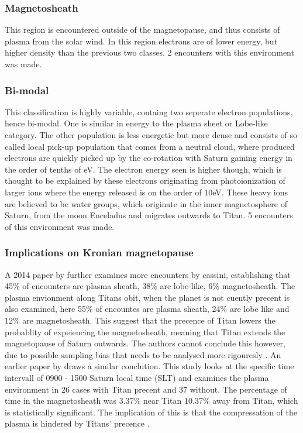 \documentclass[12pt, parskip=full*, abstract]{scrartcl}
\begin{document}
\subsubsection{Magnetosheath}

This region is encountered outside of the magnetopause, and thus consists of plasma from the solar wind. In this region electrons are of lower energy, but higher density than the previous two classes. 2 encounters with this environment was made.\parencite{Rymer-class}

\subsubsection{Bi-modal}
This classification is highly variable, containg two seperate electron populations, hence bi-modal. One is similar in energy to the plasma sheet or Lobe-like category. The other population is less energetic but more dense and consists of so called local pick-up population that comes from a neutral cloud, where produced electrons are quickly picked up by the co-rotation with Saturn gaining energy in the order of tenths of eV. The electron energy seen is higher though, which is thought to be explained by these electrons originating from photoionization of larger ions where the energy released is on the order of 10eV. These heavy ions are believed to be water groups, which originate in the inner magnetosphere of Saturn, from the moon Enceladus and migrates outwards to Titan. 5 encounters of this environment was made.\parencite{Rymer-class}

\subsubsection{Implications on Kronian magnetopause}
A 2014 paper by \textcite{Smith-WithOrWithoutTitan} further examines more encounters by cassini, establishing that 45\% of encounters are plasma sheath, 38\% are lobe-like, 6\% magnetosheath. The plasma envionment along Titans obit, when the planet is not cuently precent is also examined, here 55\% of encountes are plasma sheath, 24\% are lobe like and 12\% are magnetosheath. This suggest that the precence of Titan lowers the probablity of expeiencing the magnetosheath, meaning that Titan extends the magnetopause of Saturn outwards.
The authors cannot conclude this however, due to possible sampling bias that needs to be analysed more rigouresly \parencite{Smith-WithOrWithoutTitan}. An earlier paper by \textcite{Wei-WithOrWithoutTitan} draws a similar conclution. This study looks at the specific time intervall of 0900 - 1500 Saturn local time (SLT) and examines the plasma environment in 26 cases with Titan precent and 37 without. The percentage of time in the magnetosheath was 3.37\% near Titan 10.37\% away from Titan, which is statistically significant. The implication of this is that the compressation of the plasma is hindered by Titans' precence \parencite{Wei-WithOrWithoutTitan}.  
\end{document}
